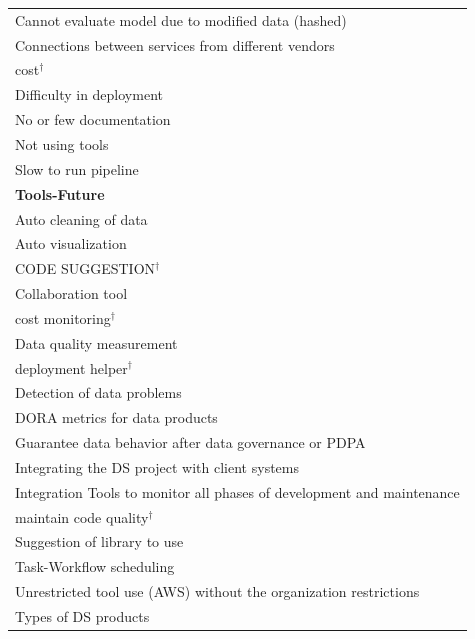 \documentclass[11pt]{article}
\begin{document}
\begin{longtable}{@{}p{15cm}@{}}
\hspace*{3.0em}Cannot evaluate model due to modified data (hashed) \\
\hspace*{3.0em}Connections between services from different vendors \\
\hspace*{3.0em}cost$^\dagger$ \\
\hspace*{3.0em}Difficulty in deployment \\
\hspace*{3.0em}No or few documentation \\
\hspace*{3.0em}Not using tools \\
\hspace*{3.0em}Slow to run pipeline \\
\hspace*{0.0em}\textbf{Tools-Future} \\
\hspace*{1.5em}Auto cleaning of data \\
\hspace*{1.5em}Auto visualization \\
\hspace*{1.5em}CODE SUGGESTION$^\dagger$ \\
\hspace*{1.5em}Collaboration tool \\
\hspace*{1.5em}cost monitoring$^\dagger$ \\
\hspace*{1.5em}Data quality measurement \\
\hspace*{1.5em}deployment helper$^\dagger$ \\
\hspace*{1.5em}Detection of data problems \\
\hspace*{1.5em}DORA metrics for data products \\
\hspace*{1.5em}Guarantee data behavior after data governance or PDPA \\
\hspace*{1.5em}Integrating the DS project with client systems \\
\hspace*{1.5em}Integration Tools to monitor all phases of development and maintenance \\
\hspace*{1.5em}maintain code quality$^\dagger$ \\
\hspace*{1.5em}Suggestion of library to use \\
\hspace*{1.5em}Task-Workflow scheduling \\
\hspace*{1.5em}Unrestricted tool use (AWS) without the organization restrictions \\
\hspace*{0.0em}Types of DS products \\
\end{longtable}
\end{document}
